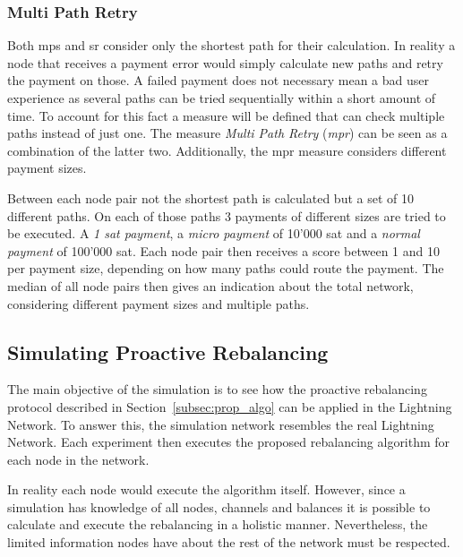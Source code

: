\documentclass[final]{fhnwreport}       %
\begin{document}
\subsubsection{Multi Path Retry}
Both \gls{mps} and \gls{sr} consider only the shortest path for their calculation. In reality a node that receives a payment error would simply calculate new paths and retry the payment on those. A failed payment does not necessary mean a bad user experience as several paths can be tried sequentially within a short amount of time. To account for this fact a measure will be defined that can check multiple paths instead of just one. The measure \emph{Multi Path Retry} (\emph{\gls{mpr}}) can be seen as a combination of the latter two. Additionally, the \gls{mpr} measure considers different payment sizes.

Between each node pair not the shortest path is calculated but a set of 10 different paths. On each of those paths 3 payments of different sizes are tried to be executed. A \emph{1 sat payment}, a \emph{micro payment} of 10'000 sat and a \emph{normal payment} of 100'000 sat. Each node pair then receives a score between 1 and 10 per payment size, depending on how many paths could route the payment. The median of all node pairs then gives an indication about the total network, considering different payment sizes and multiple paths.


\subsection{Simulating Proactive Rebalancing}\label{subsec:pro}
The main objective of the simulation is to see how the proactive rebalancing protocol described in Section~\ref{subsec:prop_algo} can be applied in the Lightning Network. To answer this, the simulation network resembles the real Lightning Network. Each experiment then executes the proposed rebalancing algorithm for each node in the network.

In reality each node would execute the algorithm itself. However, since a simulation has knowledge of all nodes, channels and balances it is possible to calculate and execute the rebalancing in a holistic manner. Nevertheless, the limited information nodes have about the rest of the network must be respected. 
\end{document}
